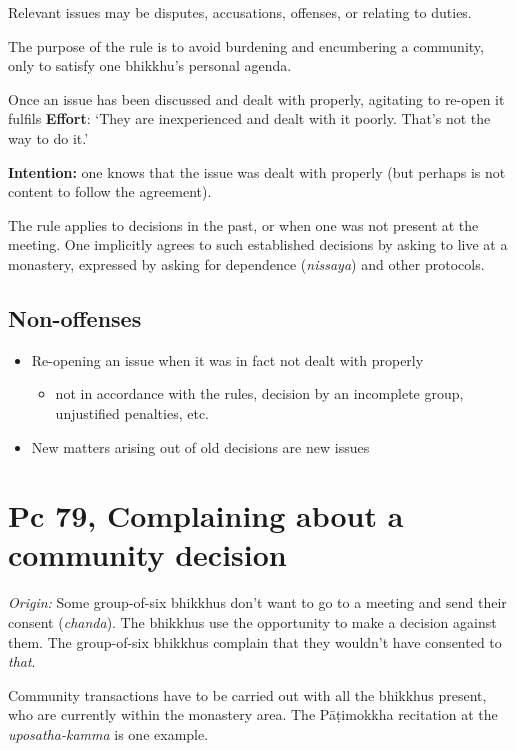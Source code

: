 Relevant issues may be disputes, accusations, offenses, or relating to
duties.

The purpose of the rule is to avoid burdening and encumbering a
community, only to satisfy one bhikkhu's personal agenda.

Once an issue has been discussed and dealt with properly, agitating to
re-open it fulfils \textbf{Effort}: `They are inexperienced and dealt
with it poorly. That's not the way to do it.'

\textbf{Intention:} one knows that the issue was dealt with properly
(but perhaps is not content to follow the agreement).

The rule applies to decisions in the past, or when one was not present
at the meeting. One implicitly agrees to such established decisions by
asking to live at a monastery, expressed by asking for dependence
(\emph{nissaya}) and other protocols.

\subsection{Non-offenses}

\begin{itemize}
\tightlist
\item
  Re-opening an issue when it was in fact not dealt with properly

  \begin{itemize}
  \tightlist
  \item
    not in accordance with the rules, decision by an incomplete group,
    unjustified penalties, etc.
  \end{itemize}
\item
  New matters arising out of old decisions are new issues
\end{itemize}

\section{Pc 79, Complaining about a community decision}

\emph{Origin:} Some group-of-six bhikkhus don't want to go to a meeting
and send their consent (\emph{chanda}). The bhikkhus use the opportunity
to make a decision against them. The group-of-six bhikkhus complain that
they wouldn't have consented to \emph{that}.

Community transactions have to be carried out with all the bhikkhus
present, who are currently within the monastery area. The Pāṭimokkha
recitation at the \emph{uposatha-kamma} is one example.

